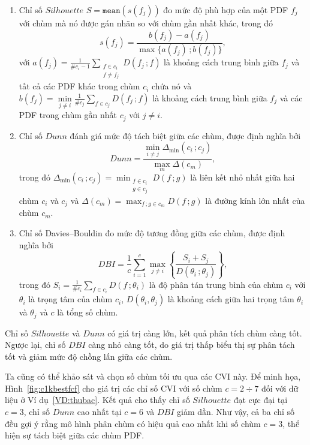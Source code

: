 \documentclass[a4paper,oneside]{book} %
\theoremstyle{plain}
\theoremstyle{plain}
\theoremstyle{nonumberplain}
\newcommand{\chy}[1]{\begin{remark}#1\end{remark}}
\begin{document}
\begin{enumerate}[label=(\roman*), leftmargin=2em, itemsep=1ex]
	\item Chỉ số $Silhouette$ $S = \mathtt{mean}(s(f_j))$ đo mức độ phù hợp của một PDF $f_j$ với chùm mà nó được gán nhãn so với chùm gần nhất khác, trong đó $$s(f_j) = \frac{b(f_j) - a(f_j)}{\max \{ a(f_j)\,; b(f_j) \}},$$ với $	a(f_j) = \frac{1}{\#c_i - 1} \sum_{\substack{f \in c_i \\ f \ne f_j}} D(f_j\,; f)	$ là khoảng cách trung bình giữa $f_j$ và tất cả các PDF khác trong chùm $c_i$ chứa nó và $	b(f_j) = \min\limits_{j \ne i} \frac{1}{\#c_j} \sum_{f \in c_j} D(f_j\,; f)$ là khoảng cách trung bình giữa $f_j$ và các PDF trong chùm gần nhất $c_j$ với $j \ne i$.
	
	\item Chỉ số $Dunn$ đánh giá mức độ tách biệt giữa các chùm, được định nghĩa bởi $${Dunn} = \frac{ \min_{i \ne j} \Delta_{\min}(c_i\,; c_j)}{ \max_{m}\Delta(c_m)},$$ trong đó $\Delta_{\min}(c_i\,;  c_j) = \min_{\substack{f \in c_i \\ g \in c_j}} D(f\,;  g)$ là liên kết nhỏ nhất giữa hai chùm $c_i$ và $c_j$ và $\Delta(c_m) = \max_{f\,;  g \in c_m} D(f\,;  g)$ là đường kính lớn nhất của chùm $c_m$.
	
	\item Chỉ số Davies--Bouldin đo mức độ tương đồng giữa các chùm, được định nghĩa bởi $$DBI = \frac{1}{c}\sum_{i=1}^{c} \max_{j \ne i}\left\{\frac{S_i + S_j}{D(\theta_i\,;  \theta_j)}\right\},$$	trong đó $S_i = \frac{1}{\#c_i} \sum_{f \in c_i} D(f\,;  \theta_i)$	là độ phân tán trung bình của chùm $c_i$ với $\theta_i$ là trọng tâm của chùm $c_i$, $D(\theta_i, \theta_j)$ là khoảng cách giữa hai trọng tâm $\theta_i$ và $\theta_j$ và $c$ là tổng số chùm.
	
\end{enumerate}
	
\chy{Chỉ số $Silhouette$ và $Dunn$ có giá trị càng lớn, kết quả phân tích chùm càng tốt. Ngược lại, chỉ số $DBI$ càng nhỏ càng tốt, do giá trị thấp biểu thị sự phân tách tốt và giảm mức độ chồng lấn giữa các chùm. }

Ta cũng có thể khảo sát và chọn số chùm tối ưu qua các CVI này. Để minh họa, Hình~\ref{fig:c1kbestfcf} cho giá trị các chỉ số CVI với số chùm $c=2\div7$ đối với dữ liệu ở Ví dụ~\ref{VD:thubac}. Kết quả cho thấy chỉ số $Silhouette$ đạt cực đại tại $c=3$, chỉ số $Dunn$ cao nhất tại $c=6$ và $DBI$ giảm dần. Như vậy, cả ba chỉ số đều gợi ý rằng mô hình phân chùm có hiệu quả cao nhất khi số chùm $c=3$, thể hiện sự tách biệt giữa các chùm PDF.
\end{document}
